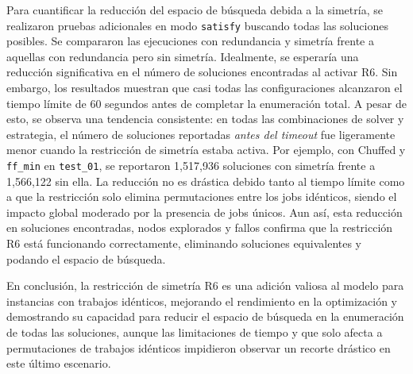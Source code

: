 Para cuantificar la reducción del espacio de búsqueda debida
a la simetría, se realizaron pruebas adicionales en modo \texttt{satisfy}
buscando todas las soluciones posibles.
Se compararon las ejecuciones con redundancia y simetría
frente a aquellas con redundancia pero sin simetría.
Idealmente, se esperaría una reducción significativa en el número de soluciones
encontradas al activar R6. Sin embargo, los resultados muestran que casi todas
las configuraciones alcanzaron el tiempo límite de 60 segundos
antes de completar la enumeración total. A pesar de esto, se observa una
tendencia consistente: en todas las combinaciones de solver y estrategia,
el número de soluciones reportadas \textit{antes del timeout} fue ligeramente
menor cuando la restricción de simetría estaba activa. Por ejemplo,
con Chuffed y \texttt{ff\_min} en \texttt{test\_01}, se reportaron 1,517,936
soluciones con simetría frente a 1,566,122 sin ella. La reducción no es drástica debido tanto al tiempo límite como a que la restricción solo elimina permutaciones entre los jobs idénticos, siendo el impacto global moderado por la presencia de jobs únicos. Aun así, esta reducción en soluciones encontradas, nodos explorados
y fallos confirma que
la restricción R6 está funcionando correctamente, eliminando soluciones
equivalentes y podando el espacio de búsqueda.

En conclusión, la restricción de simetría R6 es una adición valiosa al modelo
para instancias con trabajos idénticos, mejorando el
rendimiento en la optimización y demostrando su capacidad para reducir el
espacio de búsqueda en la enumeración de todas las soluciones, aunque las
limitaciones de tiempo y que solo afecta a permutaciones de trabajos idénticos impidieron observar un recorte drástico en este último escenario.